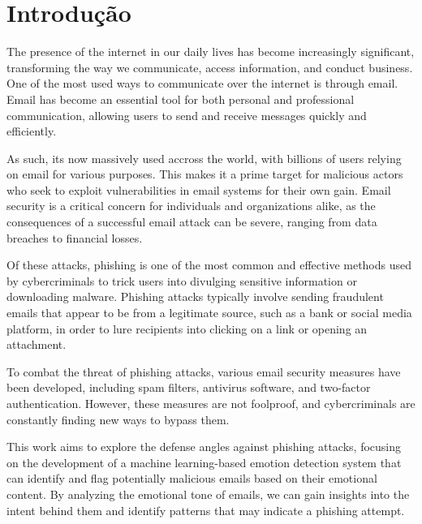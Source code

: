 \chapter{Introdução}%
\label{chapter:introduction}

The presence of the internet in our daily lives has become increasingly significant, transforming the way we communicate, access information, and conduct business. One of the most used ways to communicate over the internet is through email. Email has become an essential tool for both personal and professional communication, allowing users to send and receive messages quickly and efficiently.

As such, its now massively used accross the world, with billions of users relying on email for various purposes. This makes it a prime target for malicious actors who seek to exploit vulnerabilities in email systems for their own gain. Email security is a critical concern for individuals and organizations alike, as the consequences of a successful email attack can be severe, ranging from data breaches to financial losses.

Of these attacks, phishing is one of the most common and effective methods used by cybercriminals to trick users into divulging sensitive information or downloading malware. Phishing attacks typically involve sending fraudulent emails that appear to be from a legitimate source, such as a bank or social media platform, in order to lure recipients into clicking on a link or opening an attachment.

To combat the threat of phishing attacks, various email security measures have been developed, including spam filters, antivirus software, and two-factor authentication. However, these measures are not foolproof, and cybercriminals are constantly finding new ways to bypass them.

This work aims to explore the defense angles against phishing attacks, focusing on the development of a machine learning-based emotion detection system that can identify and flag potentially malicious emails based on their emotional content. By analyzing the emotional tone of emails, we can gain insights into the intent behind them and identify patterns that may indicate a phishing attempt.